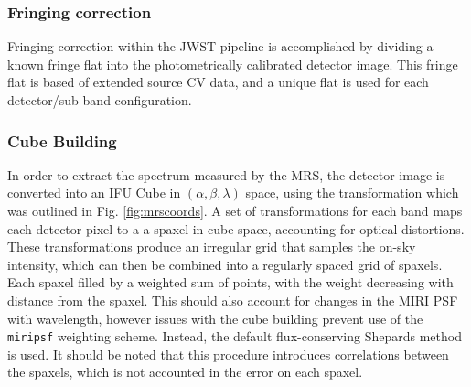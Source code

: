 \subsubsection{Fringing correction}
Fringing correction within the JWST pipeline is accomplished by dividing a known fringe flat into the photometrically calibrated detector image. 
This fringe flat is based of extended source CV data, and a unique flat is used for each detector/sub-band configuration.

\subsubsection{Cube Building}
In order to extract the spectrum measured by the MRS, the detector image is converted into an IFU Cube in $(\alpha,\beta,\lambda)$ space, using the transformation which was outlined in Fig. \ref{fig:mrscoords}.
A set of transformations for each band maps each detector pixel to a a spaxel in cube space, accounting for  optical distortions. 
These transformations produce an irregular grid that samples the on-sky intensity, which can then be combined into a regularly spaced grid of spaxels.
Each spaxel filled by a weighted sum of points, with the weight decreasing with distance from the spaxel. 
This should also account for changes in the MIRI PSF with wavelength, however issues with the cube building prevent use of the \verb|miripsf| weighting scheme.
Instead, the default flux-conserving Shepards method is used.
It should be noted that this procedure introduces correlations between the spaxels, which is not accounted in the error on each spaxel.

